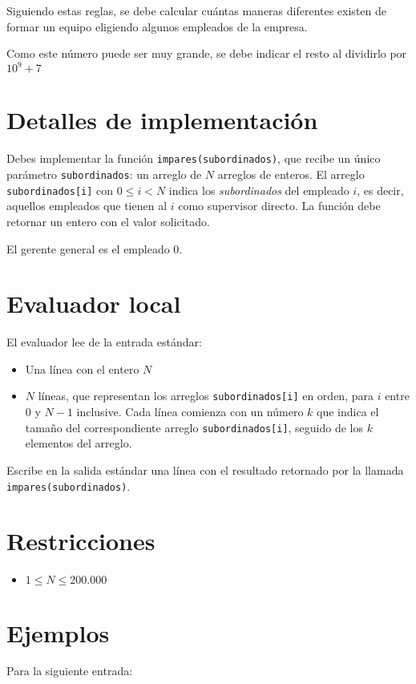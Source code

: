 \documentclass[fontsize=13pt, paper=a4, DIV=calc]{scrartcl}
\begin{document}
\begin{multicols*}{2}
Siguiendo estas reglas, se debe calcular cuántas maneras diferentes existen de formar un equipo eligiendo algunos empleados de la empresa.

Como este número puede ser muy grande, se debe indicar el resto al dividirlo por $10^9+7$

\columnbreak

\section{Detalles de implementación}

Debes implementar la función \texttt{impares(subordinados)}, que recibe un único parámetro \texttt{subordinados}: un arreglo de $N$ arreglos de enteros. El arreglo \texttt{subordinados[i]} con $0 \leq i < N$ indica los \textit{subordinados} del empleado $i$, es decir, aquellos empleados que tienen al $i$ como supervisor directo.
La función debe retornar un entero con el valor solicitado.

El gerente general es el empleado 0. 


\section{Evaluador local}

El evaluador lee de la entrada estándar: 
\begin{itemize}
    \item Una línea con el entero $N$
    \item $N$ líneas, que representan los arreglos \texttt{subordinados[i]} en orden, para $i$ entre $0$ y $N-1$ inclusive. Cada línea comienza con un número $k$ que indica el tamaño del correspondiente arreglo \texttt{subordinados[i]}, seguido de los $k$ elementos del arreglo.
\end{itemize}

Escribe en la salida estándar una línea con el resultado retornado por la llamada \texttt{impares(subordinados)}.

\section{Restricciones}
  \begin{itemize}
      \item $1 \leq N \leq 200.000$
  \end{itemize}

\columnbreak

\section{Ejemplos}
{\footnotesize
Para la siguiente entrada:

}
\end{multicols*}
\end{document}
